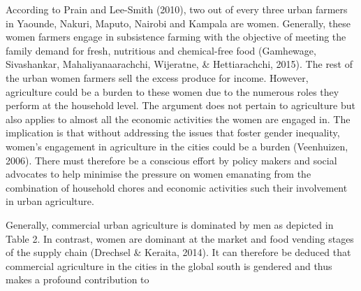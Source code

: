 According to Prain and Lee-Smith (2010), two out of every three urban farmers in Yaounde, Nakuri, Maputo, Nairobi and Kampala are women. Generally, these women farmers engage in subsistence farming with the objective of meeting the family demand for fresh, nutritious and chemical-free food (Gamhewage, Sivashankar, Mahaliyanaarachchi, Wijeratne, & Hettiarachchi, 2015). The rest of the urban women farmers sell the excess produce for income. However, agriculture could be a burden to these women due to the numerous roles they perform at the household level. The argument does not pertain to agriculture but also applies to almost all the economic activities the women are engaged in. The implication is that without addressing the issues that foster gender inequality, women's engagement in agriculture in the cities could be a burden (Veenhuizen, 2006). There must therefore be a conscious effort by policy makers and social advocates to help minimise the pressure on women emanating from the combination of household chores and economic activities such their involvement in urban agriculture.

Generally, commercial urban agriculture is dominated by men as depicted in Table 2. In contrast, women are dominant at the market and food vending stages of the supply chain (Drechsel & Keraita, 2014). It can therefore be deduced that commercial agriculture in the cities in the global south is gendered and thus makes a profound contribution to



